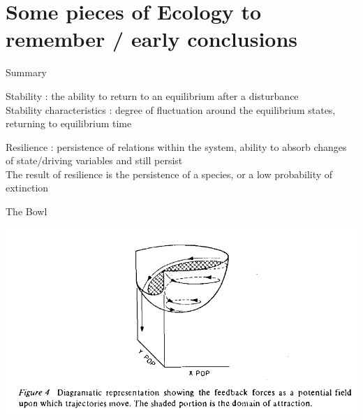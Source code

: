 \documentclass[11,aspectratio=1610]{beamer}
\begin{document}
\section{Some pieces of Ecology  to remember / early conclusions}


\begin{frame}{Summary}



\alert{Stability} : the ability to return to an equilibrium after a disturbance\\
Stability characteristics  : degree of fluctuation  around the equilibrium states, returning to equilibrium time

\vfill

\alert{Resilience} : persistence of relations within the system, ability to absorb changes of state/driving  variables and still persist\\
The result of resilience is the persistence of a species, or a low probability of extinction 


\end{frame}



\begin{frame}{The Bowl}



\includegraphics[height=0.8\textheight]{img/bowl.png}

\end{frame}
\end{document}
